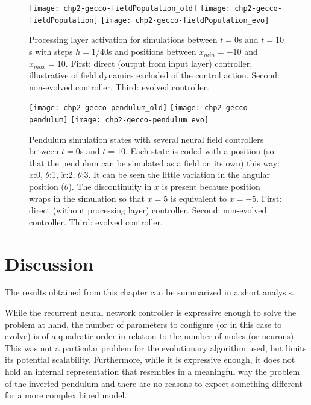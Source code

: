 \begin{figure}[p]
  \centering
  \texttt{[image: chp2-gecco-fieldPopulation\_old]}
  \texttt{[image: chp2-gecco-fieldPopulation]}
  \texttt{[image: chp2-gecco-fieldPopulation\_evo]}
  \caption{Processing layer activation for simulations between $t=0$s
    and $t=10$s with steps $h=1/40$s and positions between
    $x_{min}=-10$ and $x_{max}=10$. First: direct (output from input
    layer) controller, illustrative of field dynamics excluded of the
    control action. Second: non-evolved controller. Third: evolved
    controller.}
  \label{fig:processings}
\end{figure}


\begin{figure}
  \centering
  \texttt{[image: chp2-gecco-pendulum\_old]}
  \texttt{[image: chp2-gecco-pendulum]}
  \texttt{[image: chp2-gecco-pendulum\_evo]}
  \caption{Pendulum simulation states with several neural field
    controllers between $t=0$s and $t=10$. Each state is coded with a
    position (so that the pendulum can be simulated as a field on its
    own) this way: $x$:0, $\theta$:1, $\dot{x}$:2,
    $\dot{\theta}$:3. It can be seen the little variation in the
    angular position ($\theta$). The discontinuity in $x$ is present
    because position wraps in the simulation so that $x=5$ is
    equivalent to $x=-5$. First: direct (without processing layer)
    controller. Second: non-evolved controller. Third: evolved
    controller.}
  \label{fig:pendulum-states}
\end{figure}


\section{Discussion}
The results obtained from this chapter can be summarized in a short
analysis.

While the recurrent neural network controller is expressive enough to
solve the problem at hand, the number of parameters to configure (or
in this case to evolve) is of a quadratic order in relation to the
number of nodes (or neurons). This was not a particular problem for
the evolutionary algorithm used, but limits its potential
scalability. Furthermore, while it is expressive enough, it does not hold an internal representation that resembles in a meaningful way the problem of the
inverted pendulum and there are no reasons to expect something
different for a more complex biped model.

